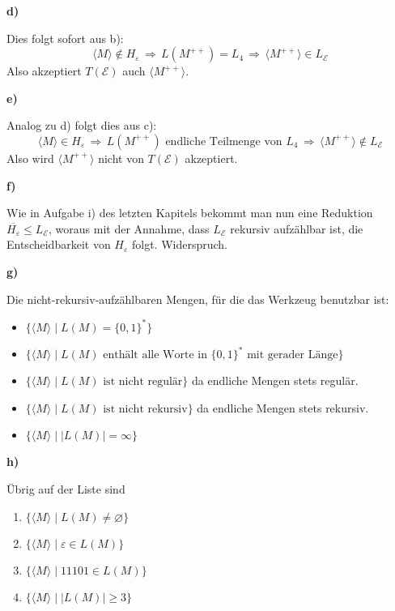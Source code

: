 \documentclass[a4paper,graphics,11pt]{article}
\newcommand{\eps}[0]{\varepsilon}
\newcommand{\godel}[1]{\langle #1 \rangle}
\begin{document}
\strut

\textbf{d)}

Dies folgt sofort aus b):
$$
    \godel{M} \notin H_\eps \,\Longrightarrow\, L(M^{++}) = L_4 \,\Longrightarrow\, \godel{M^{++}} \in L_\mathcal{E}
$$
Also akzeptiert $T(\mathcal{E})$ auch $\godel{M^{++}}$.

\strut

\textbf{e)}

Analog zu d) folgt dies aus c):
$$
    \godel{M} \in H_\eps \,\Longrightarrow\, L(M^{++}) \text{ endliche Teilmenge von $L_4$}
    \,\Longrightarrow\, \godel{M^{++}} \notin L_\mathcal{E}
$$
Also wird $\godel{M^{++}}$ nicht von $T(\mathcal{E})$ akzeptiert.

\newpage

\textbf{f)}

Wie in Aufgabe i) des letzten Kapitels bekommt man nun eine Reduktion $\overline{H_\eps} \leq L_\mathcal{E}$,
woraus mit der Annahme, dass $L_\mathcal{E}$ rekursiv aufzählbar ist, die Entscheidbarkeit von $H_\eps$
folgt. Widerspruch.

\strut

\textbf{g)}

Die nicht-rekursiv-aufzählbaren Mengen, für die das Werkzeug benutzbar ist:

\begin{itemize}
    \item $\{\godel{M} \mid L(M) = \{0,1\}^*\}$
    \item $\{\godel{M} \mid L(M) \text{ enthält alle Worte in $\{0,1\}^*$ mit gerader Länge}\}$
    \item $\{\godel{M} \mid L(M) \text{ ist nicht regulär}\}$ da endliche Mengen stets regulär.
    \item $\{\godel{M} \mid L(M) \text{ ist nicht rekursiv}\}$ da endliche Mengen stets rekursiv.
    \item $\{\godel{M} \mid |L(M)| = \infty\}$
\end{itemize}

\strut

\textbf{h)}

Übrig auf der Liste sind
\begin{enumerate}
    \item $\{\godel{M} \mid L(M) \neq \varnothing\}$ 
    \item $\{\godel{M} \mid \eps \in L(M)\}$
    \item $\{\godel{M} \mid 11101 \in L(M)\}$
    \item $\{\godel{M} \mid |L(M)| \geq 3\}$
\end{enumerate}
\end{document}
